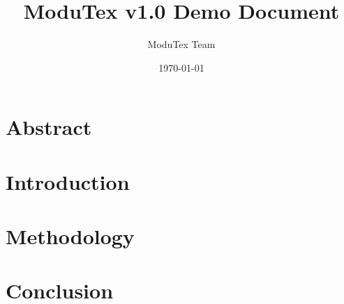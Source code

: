 \documentclass[11pt,a4paper]{article}
\title{ModuTex v1.0 Demo Document}
\author{ModuTex Team}
\date{\today}
\begin{document}
\maketitle

\tableofcontents
\newpage

\section{Abstract}


\section{Introduction}  


\section{Methodology}


\section{Conclusion}


\newpage


\end{document}
